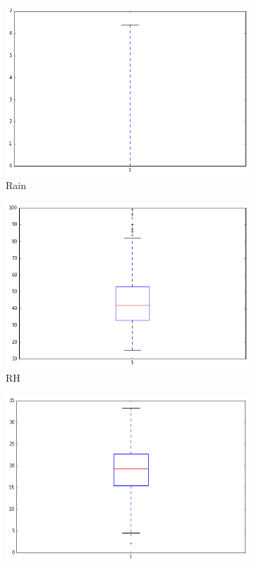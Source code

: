 \begin{figure}[!ht]

\begin{subfigure}[b]{.45\linewidth}
\includegraphics[width=\linewidth]{fig/boxplots/rain.png}
\caption{Rain}\label{fig:mouse}
\end{subfigure}
\begin{subfigure}[b]{.45\linewidth}
\includegraphics[width=\linewidth]{fig/boxplots/RH.png}
\caption{RH}\label{fig:mouse}
\end{subfigure}
\begin{subfigure}[b]{.45\linewidth}
\includegraphics[width=\linewidth]{fig/boxplots/temp.png}

\end{subfigure}
\end{figure}
